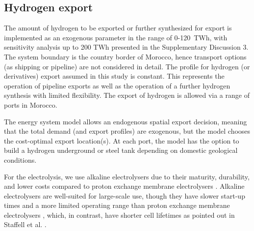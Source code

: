 \documentclass[5p,numafflabel]{elsarticle}
\begin{document}
\subsection*{Hydrogen export}
\label{subsec:hydrogen_export}
The amount of hydrogen to be exported or further synthesized for export is  implemented as an exogenous parameter in the range of 0-120~TWh, with sensitivity analysis up to 200 TWh presented in the Supplementary Discussion 3.
The system boundary is the country border of Morocco, hence transport options (as shipping or pipeline) are not considered in detail. The profile for hydrogen (or derivatives) export assumed in this study is constant. This represents the operation of pipeline exports as well as the operation of a further hydrogen synthesis with limited flexibility. The export of hydrogen is allowed via a range of ports in Morocco.


The energy system model allows an endogenous spatial export decision, meaning that the total demand (and export profiles) are exogenous, but the model chooses the  cost-optimal export location(s). At each port, the model has the option to build a hydrogen underground or steel tank depending on domestic geological conditions.

For the electrolysis, we use alkaline electrolysers due to their maturity, durability, and lower costs compared to proton exchange membrane electrolysers \cite{Staffell2019,DEA2019TechnologyData}.
Alkaline electrolysers are well-suited for large-scale use, though they have slower start-up times and a more limited operating range   
than proton exchange membrane electrolysers \cite{Staffell2019, Gotz2016}, which, in contrast, have  shorter cell lifetimes as pointed out in Staffell et al. \cite{Staffell2019}.







\end{document}
